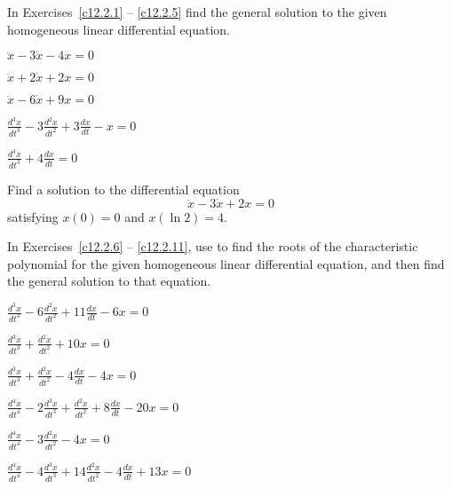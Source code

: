 \documentclass{ximera}
\begin{document}
\noindent In Exercises~\ref{c12.2.1} -- \ref{c12.2.5} find the general 
solution to the given homogeneous linear differential equation.
\begin{exercise} \label{c12.2.1}
$\ddot{x}-3\dot{x}-4x = 0$
\end{exercise}
\begin{exercise} \label{c12.2.2}
$\ddot{x}+2\dot{x}+2x = 0$
\end{exercise}
\begin{exercise} \label{c12.2.3}
$\ddot{x}-6\dot{x}+9x = 0$
\end{exercise}
\begin{exercise} \label{c12.2.4}
$\frac{d^3x}{dt^3} -3\frac{d^2x}{dt^2}+3\frac{dx}{dt}-x=0$
\end{exercise}
\begin{exercise} \label{c12.2.5}
$\frac{d^3x}{dt^3}+4\frac{dx}{dt} = 0$
\end{exercise}

\begin{exercise} \label{c12.2.a6}
Find a solution to the differential equation 
\[
\ddot{x} -3\dot{x} + 2x = 0
\]
satisfying $x(0)=0$ and $x(\ln 2) = 4$.
\end{exercise}




\CEXER

\noindent In Exercises~\ref{c12.2.6} -- \ref{c12.2.11}, use \Matlab to find 
the roots of the characteristic polynomial for the given homogeneous linear 
differential equation, and then find the general solution to that equation.
\begin{exercise} \label{c12.2.6}
$\frac{d^3x}{dt^3} -6\frac{d^2x}{dt^2}+11\frac{dx}{dt}-6x=0$
\end{exercise}
\begin{exercise} \label{c12.2.7}
$\frac{d^3x}{dt^3} + \frac{d^2x}{dt^2}+ 10x=0$
\end{exercise}
\begin{exercise} \label{c12.2.8}
$\frac{d^3x}{dt^3} +\frac{d^2x}{dt^2}-4\frac{dx}{dt}-4x=0$
\end{exercise}
\begin{exercise} \label{c12.2.9}
$\frac{d^4x}{dt^4}-2\frac{d^3x}{dt^3}+\frac{d^2x}{dt^2}+8\frac{dx}{dt}-20x=0$
\end{exercise}
\begin{exercise} \label{c12.2.10}
$\frac{d^4x}{dt^4}-3\frac{d^2x}{dt^2}-4x=0$
\end{exercise}
\begin{exercise} \label{c12.2.11}
$\frac{d^4x}{dt^4}-4\frac{d^3x}{dt^3}+14\frac{d^2x}{dt^2}-4\frac{dx}{dt}+13x=0$
\end{exercise}
\end{document}
